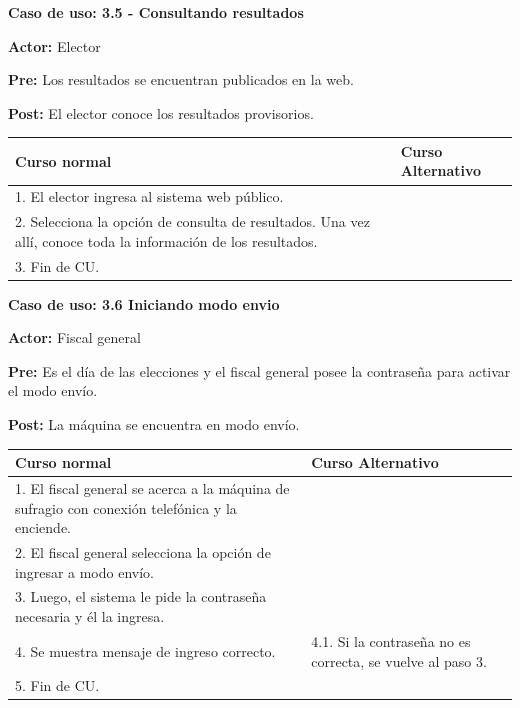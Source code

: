 \textbf{Caso de uso: 3.5 - Consultando resultados} 

\textbf{Actor:} Elector

\textbf{Pre:} Los resultados se encuentran publicados en la web.

\textbf{Post:} El elector conoce los resultados provisorios.

\begin{table}[h!]
	
 \begin{tabular}{|p{7.5cm} | p{7.5cm}|} 
 \hline
 \textbf{Curso normal} & \textbf{Curso Alternativo} \\
 \hline
 
1. El elector ingresa al sistema web público. & \\
\hline


2. Selecciona la opción de consulta de resultados. Una vez allí, conoce toda la información de los resultados. & \\
\hline


3. Fin de CU. & \\
\hline
\end{tabular}
\end{table}



\textbf{Caso de uso: 3.6 Iniciando modo envio}

\textbf{Actor:} Fiscal general

\textbf{Pre:} Es el día de las elecciones y el fiscal general posee la contraseña para activar el modo envío.

\textbf{Post:} La máquina se encuentra en modo envío.

\begin{table}[h!]
	
 \begin{tabular}{|p{7.5cm} | p{7.5cm}|} 
 \hline
 \textbf{Curso normal} & \textbf{Curso Alternativo} \\
 \hline

1. El fiscal general se acerca a la máquina de sufragio con conexión telefónica y la enciende. & \\
\hline

2. El fiscal general selecciona la opción de ingresar a modo envío. & \\
\hline

3. Luego, el sistema le pide la contraseña necesaria y él la ingresa. & \\
\hline

4. Se muestra mensaje de ingreso correcto. &
4.1. Si la contraseña no es correcta, se vuelve al paso 3. \\
\hline
5. Fin de CU. \\
\hline
\end{tabular}
\end{table}


